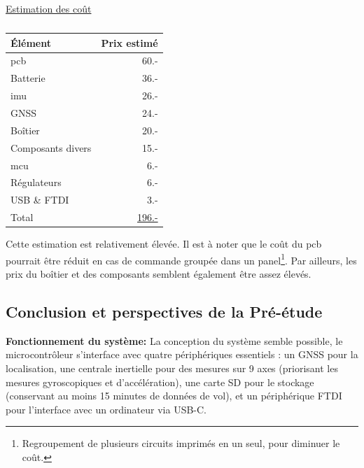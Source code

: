 \begin{center}
	\underline{Estimation des coût} 
	\vspace{-4mm}
	\begin{table}[h]
		\centering
		\begin{tabular}{lr}
			Élément & Prix estimé \\
			\hline
			\gls{pcb} & 60.- \\
			Batterie & 36.- \\
			\gls{imu} & 26.- \\
			\gls{GNSS} & 24.- \\
			Boîtier & 20.- \\
			Composants divers & 15.- \\
			\gls{mcu} & 6.- \\
			Régulateurs & 6.- \\
			USB \& \gls{FTDI} & 3.- \\
			\hline
			Total & \underline{196.-} \\
			\hline
		\end{tabular}
		\caption{}
		\label{tab:estimcouts}
	\end{table}
\end{center} \vspace{-5mm}

Cette estimation est relativement élevée. Il est à noter que le coût du \gls{pcb} pourrait être réduit en cas de commande groupée dans un panel\footnote{Regroupement de plusieurs circuits imprimés en un seul, pour diminuer le coût.}. Par ailleurs, les prix du boîtier et des composants semblent également être assez élevés.


\subsection{Conclusion et perspectives de la Pré-étude}

\textbf{Fonctionnement du système:}
La conception du système semble possible, le microcontrôleur s'interface avec quatre périphériques essentiels : un \gls{GNSS} pour la localisation, une centrale inertielle pour des mesures sur 9 axes (priorisant les mesures gyroscopiques et d'accélération), une carte SD pour le stockage (conservant au moins 15 minutes de données de vol), et un périphérique \gls{FTDI} pour l'interface avec un ordinateur via USB-C.

